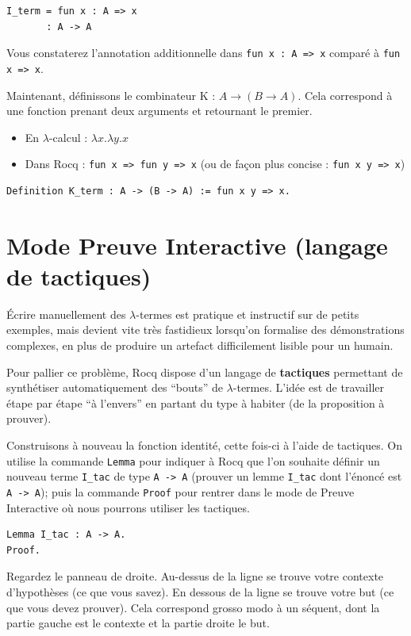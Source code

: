 \documentclass[11pt,a4paper]{article}
\begin{document}
\begin{verbatim}
I_term = fun x : A => x
       : A -> A
\end{verbatim}

Vous constaterez l'annotation additionnelle dans \texttt{fun x : A => x} comparé à \texttt{fun x => x}.

Maintenant, définissons le combinateur K : $A \to (B \to A)$.
Cela correspond à une fonction prenant deux arguments et retournant le premier.
\begin{itemize}
  \item En $\lambda$-calcul : $\lambda x.\lambda y.x$
  \item Dans Rocq : \texttt{fun x => fun y => x} (ou de façon plus concise : \texttt{fun x y => x})
\end{itemize}

\begin{lstlisting}
Definition K_term : A -> (B -> A) := fun x y => x.
\end{lstlisting}

\section{Mode Preuve Interactive (langage de tactiques)}

Écrire manuellement des $\lambda$-termes est pratique et instructif sur de petits exemples, mais devient vite très fastidieux lorsqu'on formalise des démonstrations complexes, en plus de produire un artefact difficilement lisible pour un humain.

Pour pallier ce problème, Rocq dispose d'un langage de \textbf{tactiques} permettant de synthétiser automatiquement des ``bouts'' de $\lambda$-termes. L'idée est de travailler étape par étape ``à l'envers'' en partant du type à habiter (de la proposition à prouver).

Construisons à nouveau la fonction identité, cette fois-ci à l'aide de tactiques. On utilise la commande \texttt{Lemma} pour indiquer à Rocq que l'on souhaite définir un nouveau terme \texttt{I\_tac} de type \texttt{A -> A} (prouver un lemme \texttt{I\_tac} dont l'énoncé est \texttt{A -> A}); puis la commande \texttt{Proof} pour rentrer dans le mode de Preuve Interactive où nous pourrons utiliser les tactiques.

\begin{lstlisting}
Lemma I_tac : A -> A.
Proof.
\end{lstlisting}

Regardez le panneau de droite. Au-dessus de la ligne se trouve votre contexte d'hypothèses (ce que vous savez). En dessous de la ligne se trouve votre but (ce que vous devez prouver). Cela correspond grosso modo à un séquent, dont la partie gauche est le contexte et la partie droite le but.
\end{document}
